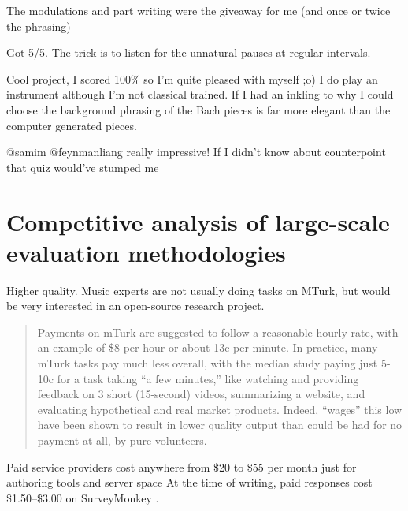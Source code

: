 The modulations and part writing were the giveaway for me (and once or twice the phrasing)

Got 5/5. The trick is to listen for the unnatural pauses at regular intervals.

Cool project, I scored 100\% so I'm quite pleased with myself ;o) I do
play an instrument although I'm not classical trained. If I had an
inkling to why I could choose the background phrasing of the Bach
pieces is far more elegant than the computer generated pieces.

@samim @feynmanliang really impressive! If I didn't know about counterpoint that quiz would've stumped me

\section{Competitive analysis of large-scale evaluation methodologies}



Higher quality. Music experts are not usually doing tasks on MTurk, but would be
very interested in an open-source research project.

\begin{quote}
Payments on mTurk are suggested to follow a reasonable hourly rate, with an
example of \$8 per hour or about 13c per minute. In practice, many mTurk
tasks pay much less overall, with the median study paying just 5-10c for a task
taking ``a few minutes,'' like watching and providing feedback on 3 short
(15-second) videos, summarizing a website, and evaluating hypothetical and real
market products. Indeed, ``wages'' this low have been shown to result in lower
quality output than could be had for no payment at all, by pure volunteers.
\end{quote}
\citep{downs2010your}

Paid service providers cost anywhere from \$20 to \$55 per month
just for authoring tools and server space\citep{JCC4:JCC411} At the time of writing,
paid responses cost \$1.50--\$3.00 on SurveyMonkey \citep{uksurveymonkey}.
